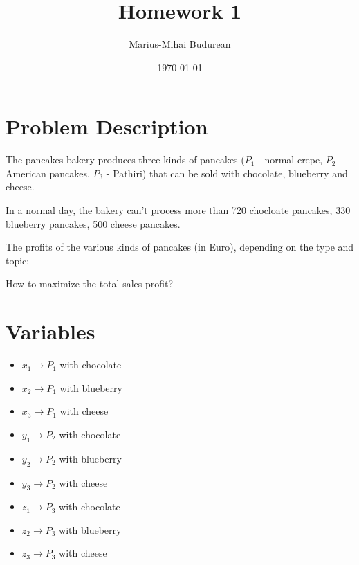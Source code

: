 \documentclass[12pt, a4paper]{article}
\title{Homework 1}
\author{Marius-Mihai Budurean}
\date{\today}
\begin{document}
\maketitle


\section{Problem Description}


\noindent The pancakes bakery produces three kinds of pancakes ($P_1$ - normal crepe, $P_2$ - American pancakes, $P_3$ - Pathiri) that can be sold with chocolate, blueberry and cheese.
\vspace{0.5cm}


\noindent In a normal day, the bakery can't process more than 720 chocloate pancakes, 330 blueberry pancakes, 500 cheese pancakes.
\vspace{0.5cm}


\noindent The profits of the various kinds of pancakes (in Euro), depending on the type and topic: \\
\vspace{0.5cm}


\noindent
{}


\vspace{0.5cm}
\noindent How to maximize the total sales profit?


\section{Variables}


\begin{itemize}
    \item $x_1 \rightarrow P_1$ with chocolate
    \item $x_2 \rightarrow P_1$ with blueberry
    \item $x_3 \rightarrow P_1$ with cheese
    \item $y_1 \rightarrow P_2$ with chocolate
    \item $y_2 \rightarrow P_2$ with blueberry
    \item $y_3 \rightarrow P_2$ with cheese
    \item $z_1 \rightarrow P_3$ with chocolate
    \item $z_2 \rightarrow P_3$ with blueberry
    \item $z_3 \rightarrow P_3$ with cheese
\end{itemize}
\end{document}
